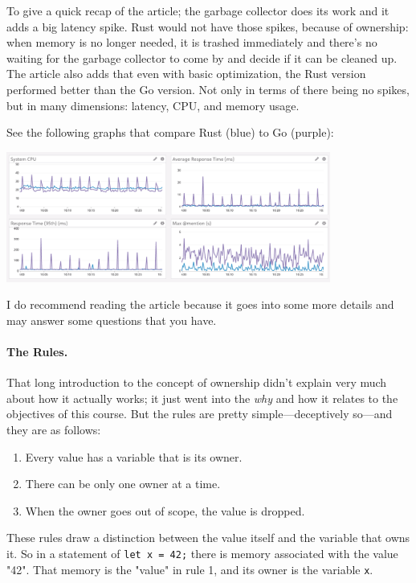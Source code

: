 To give a quick recap of the article; the garbage collector does its work and it adds a big latency spike. Rust would not have those spikes, because of ownership: when memory is no longer needed, it is trashed immediately and there's no waiting for the garbage collector to come by and decide if it can be cleaned up. The article also adds that even with basic optimization, the Rust version performed better than the Go version. Not only in terms of there being no spikes, but in many dimensions: latency, CPU, and memory usage.

See the following graphs that compare Rust (blue) to Go (purple): 
\begin{center}
\includegraphics[width=0.8\textwidth]{images/rust-vs-go.png}
\end{center}

I do recommend reading the article because it goes into some more details and may answer some questions that you have. 

\paragraph{The Rules.}
That long introduction to the concept of ownership didn't explain very much about how it actually works; it just went into the \textit{why} and how it relates to the objectives of this course. But the rules are pretty simple---deceptively so---and they are as follows:

\begin{enumerate}
	\item Every value has a variable that is its owner.
	\item There can be only one owner at a time.
	\item When the owner goes out of scope, the value is dropped.
\end{enumerate}

These rules draw a distinction between the value itself and the variable that owns it. So in a statement of \texttt{let x = 42;} there is memory associated with the value "42". That memory is the "value" in rule 1, and its owner is the variable \texttt{x}.

